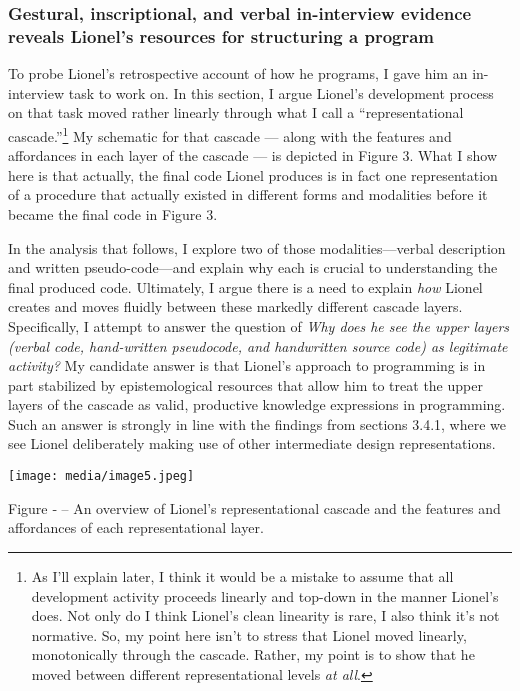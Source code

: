 \subsubsection{Gestural, inscriptional, and verbal in-interview evidence
reveals Lionel's resources for structuring a
program}\label{gestural-inscriptional-and-verbal-in-interview-evidence-reveals-lionels-resources-for-structuring-a-program}

To probe Lionel's retrospective account of how he programs, I gave him
an in-interview task to work on. In this section, I argue Lionel's
development process on that task moved rather linearly through what I
call a ``representational cascade.''\footnote{As I'll explain later, I
  think it would be a mistake to assume that all development activity
  proceeds linearly and top-down in the manner Lionel's does. Not only
  do I think Lionel's clean linearity is rare, I also think it's not
  normative. So, my point here isn't to stress that Lionel moved
  linearly, monotonically through the cascade. Rather, my point is to
  show that he moved between different representational levels \emph{at
  all}.} My schematic for that cascade --- along with the features and
affordances in each layer of the cascade --- is depicted in Figure 3.
What I show here is that actually, the final code Lionel produces is in
fact one representation of a procedure that actually existed in
different forms and modalities before it became the final code in Figure
3.

In the analysis that follows, I explore two of those modalities---verbal
description and written pseudo-code---and explain why each is crucial to
understanding the final produced code. Ultimately, I argue there is a
need to explain \emph{how} Lionel creates and moves fluidly between
these markedly different cascade layers. Specifically, I attempt to
answer the question of \emph{Why does he see the upper layers (verbal
code, hand-written pseudocode, and handwritten source code) as
legitimate activity?} My candidate answer is that Lionel's approach to
programming is in part stabilized by epistemological resources that
allow him to treat the upper layers of the cascade as valid, productive
knowledge expressions in programming. Such an answer is strongly in line
with the findings from sections 3.4.1, where we see Lionel deliberately
making use of other intermediate design representations.

\texttt{[image: media/image5.jpeg]}

\protect\hypertarget{ux5fToc252445968}{}{}Figure ‑ -- An overview of
Lionel's representational cascade and the features and affordances of
each representational layer.


